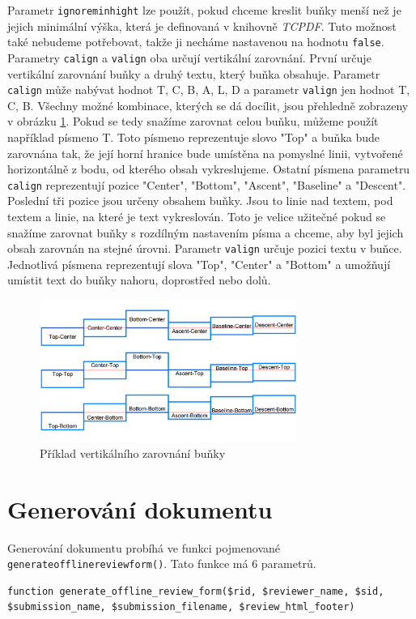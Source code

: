 \documentclass[czech,BP]{thesiskiv}
\begin{document}
Parametr \texttt{ignore\textunderscore min\textunderscore hight} lze použít, pokud chceme kreslit buňky menší než je jejich minimální výška, která je definovaná v knihovně \emph{TCPDF}. Tuto možnost také nebudeme potřebovat, takže ji necháme nastavenou na hodnotu \texttt{false}.
Parametry \texttt{calign} a \texttt{valign} oba určují vertikální zarovnání. První určuje vertikální zarovnání buňky a druhý textu, který buňka obsahuje. Parametr \texttt{calign} může nabývat hodnot T, C, B, A, L, D a parametr \texttt{valign} jen hodnot T, C, B. Všechny možné kombinace, kterých se dá docílit, jsou přehledně zobrazeny v obrázku \ref{zarovnani}. Pokud se tedy snažíme zarovnat celou buňku, můžeme použít například písmeno T. Toto písmeno reprezentuje slovo "Top" a buňka bude zarovnána tak, že její horní hranice bude umístěna na pomyslné linii, vytvořené horizontálně z bodu, od kterého obsah vykreslujeme. Ostatní písmena parametru \texttt{calign} reprezentují pozice "Center", "Bottom", "Ascent", "Baseline" a "Descent". Poslední tři pozice jsou určeny obsahem buňky. Jsou to linie nad textem, pod textem a linie, na které je text vykreslován. Toto je velice užitečné pokud se snažíme zarovnat buňky s rozdílným nastavením písma a chceme, aby byl jejich obsah zarovnán na stejné úrovni. Parametr \texttt{valign} určuje pozici textu v buňce. Jednotlivá písmena reprezentují slova "Top", "Center" a "Bottom" a umožňují umístit text do buňky nahoru, doprostřed nebo dolů.
\begin{figure}[h]
    \centering
    \includegraphics[width=0.75\textwidth]{obr1.png}
    \caption{Příklad vertikálního zarovnání buňky}
    \label{zarovnani}
\end{figure}

\section{Generování dokumentu}
Generování dokumentu probíhá ve funkci pojmenované \texttt{generate\textunderscore offline\textunderscore review\textunderscore form()}. Tato funkce má 6 parametrů. 
\label{lst:Generovani}
\begin{lstlisting}
function generate_offline_review_form($rid, $reviewer_name, $sid, $submission_name, $submission_filename, $review_html_footer)
\end{lstlisting}
\end{document}
